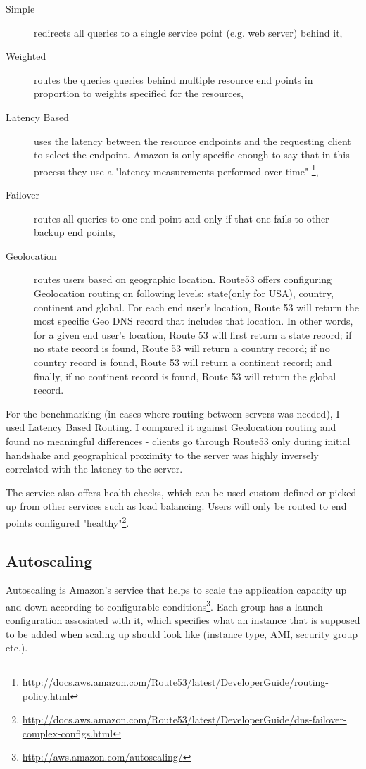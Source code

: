 \documentclass{uvamscse}
\begin{document}
\begin{description}
  \item[Simple] redirects all queries to a single service point (e.g. web server) behind it,
  \item[Weighted] routes the queries queries behind multiple resource end points in proportion to weights specified for the resources,
  \item[Latency Based] uses the latency between the resource endpoints and the requesting client to select the endpoint. Amazon is only specific enough to say that in this process they use a "latency measurements performed over time" \footnote{\url{http://docs.aws.amazon.com/Route53/latest/DeveloperGuide/routing-policy.html}},
  \item[Failover] routes all queries to one end point and only if that one fails to other backup end points,
  \item[Geolocation] routes users based on geographic location. Route53 offers configuring Geolocation routing on following levels: state(only for USA), country, continent and global. For each end user’s location, Route 53 will return the most specific Geo DNS record that includes that location. In other words, for a given end user’s location, Route 53 will first return a state record; if no state record is found, Route 53 will return a country record; if no country record is found, Route 53 will return a continent record; and finally, if no continent record is found, Route 53 will return the global record.
\end{description}

For the benchmarking (in cases where routing between servers was needed), I used Latency Based Routing. I compared it against Geolocation routing and found no meaningful differences - clients go through Route53 only during initial handshake and geographical proximity to the server was highly inversely correlated with the latency to the server.

The service also offers health checks, which can be used custom-defined or picked up from other services such as load balancing. Users will only be routed to end points configured "healthy"\footnote{\url{http://docs.aws.amazon.com/Route53/latest/DeveloperGuide/dns-failover-complex-configs.html}}.

\subsection{Autoscaling}

Autoscaling is Amazon's service that helps to scale the application capacity up and down according to configurable conditions\footnote{\url{http://aws.amazon.com/autoscaling/}}. Each group has a launch configuration assosiated with it, which specifies what an instance that is supposed to be added when scaling up should look like (instance type, AMI, security group etc.).
\end{document}
